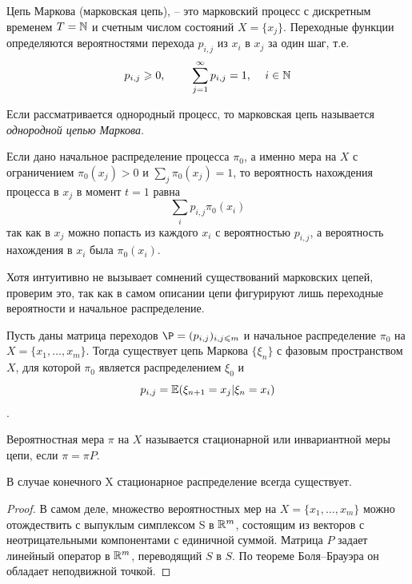 \begin{definition}
    Цепь Маркова (марковская цепь), -- это марковский процесс с дискретным временем $T = \mathbb{N}$ и счетным числом состояний $X = \{x_j\}$. Переходные функции определяются вероятностями перехода $p_{i,j}$ из $x_i$ в $x_j$ за один шаг, т.е.
    \begin{equation*}
        p_{i,j} \geqslant 0 \text{, \qquad} \sum\limits_{j=1}^{\infty}p_{i,j}=1 \text{, \quad} i \in \mathbb{N}
    \end{equation*}
\end{definition}

\begin{definition}
    Если рассматривается однородный процесс, то марковская цепь называется \textit{однородной цепью Маркова}.
\end{definition}

\begin{note}
    Если дано начальное распределение процесса $\pi_0$, а именно мера на $X$ с ограничением $\pi_0(x_j) > 0$ и $\sum_{j}\pi_0(x_j) = 1$, то вероятность нахождения процесса в $x_j$ в момент $t = 1$ равна 
    $$\sum_i p_{i,j}\pi_0(x_i)$$
    так как в $x_j$ можно попасть из каждого $x_i$ с вероятностью $p_{i,j}$, а вероятность нахождения в $x_i$ была $\pi_0(x_i)$.
\end{note}

Хотя интуитивно не вызывает сомнений существований марковских цепей, проверим это, так как в самом описании цепи фигурируют
лишь переходные вероятности и начальное распределение.
\begin{theorem}
    Пусть даны матрица переходов $\P = (p_{i,j})_{i,j\leq m}$ и начальное распределение $\pi_0$ на $X = \{x_1, \ldots , x_m\}$. Тогда существует цепь Маркова $\{\xi_n\}$ с фазовым пространством $X$, для которой $\pi_0$ является распределением $\xi_0$ и $$p_{i,j} = \operatorname{\mathbb{E}}(\xi_{n+1} = x_j |\xi_n = x_i)$$.
\end{theorem}

\begin{definition}
    Вероятностная мера $\pi$ на $X$ называется стационарной или инвариантной меры цепи, если
    $\pi = \pi P$.
\end{definition}

\begin{statement}
    В случае конечного X стационарное распределение всегда существует.
\end{statement}

\begin{proof}
    В самом деле, множество вероятностных мер на $X = \{x_1, \ldots, x_m\}$ можно отождествить с выпуклым симплексом S в $\mathbb{R}^m$, состоящим из векторов с неотрицательными компонентами с единичной суммой. Матрица $P$ задает линейный оператор в $\mathbb{R}^m$, переводящий $S$ в $S$. По теореме Боля–Брауэра он обладает неподвижной точкой. 
\end{proof}